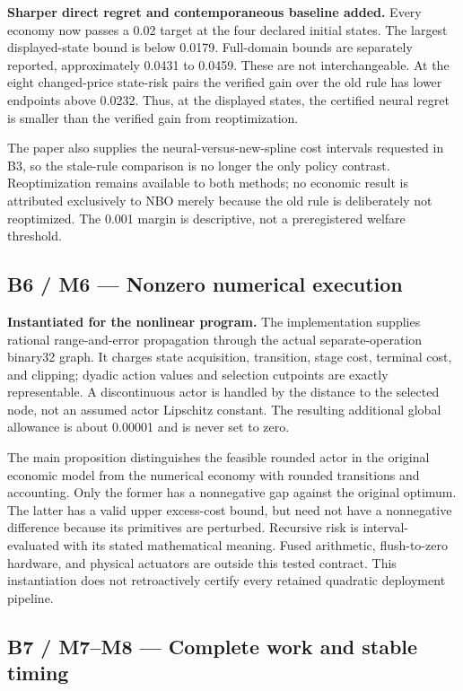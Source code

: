 \documentclass[
  11pt,
]{article}
\begin{document}
\textbf{Sharper direct regret and contemporaneous baseline added.} Every
economy now passes a 0.02 target at the four declared initial states.
The largest displayed-state bound is below 0.0179. Full-domain bounds
are separately reported, approximately 0.0431 to 0.0459. These are not
interchangeable. At the eight changed-price state-risk pairs the
verified gain over the old rule has lower endpoints above 0.0232. Thus,
at the displayed states, the certified neural regret is smaller than the
verified gain from reoptimization.

The paper also supplies the neural-versus-new-spline cost intervals
requested in B3, so the stale-rule comparison is no longer the only
policy contrast. Reoptimization remains available to both methods; no
economic result is attributed exclusively to NBO merely because the old
rule is deliberately not reoptimized. The 0.001 margin is descriptive,
not a preregistered welfare threshold.

\hypertarget{b6-m6-nonzero-numerical-execution}{%
\subsection{B6 / M6 --- Nonzero numerical
execution}\label{b6-m6-nonzero-numerical-execution}}

\textbf{Instantiated for the nonlinear program.} The implementation
supplies rational range-and-error propagation through the actual
separate-operation binary32 graph. It charges state acquisition,
transition, stage cost, terminal cost, and clipping; dyadic action
values and selection cutpoints are exactly representable. A
discontinuous actor is handled by the distance to the selected node, not
an assumed actor Lipschitz constant. The resulting additional global
allowance is about 0.00001 and is never set to zero.

The main proposition distinguishes the feasible rounded actor in the
original economic model from the numerical economy with rounded
transitions and accounting. Only the former has a nonnegative gap
against the original optimum. The latter has a valid upper excess-cost
bound, but need not have a nonnegative difference because its primitives
are perturbed. Recursive risk is interval-evaluated with its stated
mathematical meaning. Fused arithmetic, flush-to-zero hardware, and
physical actuators are outside this tested contract. This instantiation
does not retroactively certify every retained quadratic deployment
pipeline.

\hypertarget{b7-m7m8-complete-work-and-stable-timing}{%
\subsection{B7 / M7--M8 --- Complete work and stable
timing}\label{b7-m7m8-complete-work-and-stable-timing}}
\end{document}
